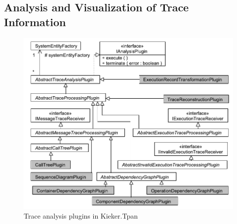 % 
% 
% 
% 
\subsection{Analysis and Visualization of Trace Information}\label{sec:traceAnalysisAndVisualization}

\begin{figure}\centering
\includegraphics[scale=0.65]{figures/model/kieker_traceprocessingcomponents}
\caption{Trace analysis plugins in Kieker.Tpan}
\label{fig:traceAnalysisPlugins}
\end{figure}

